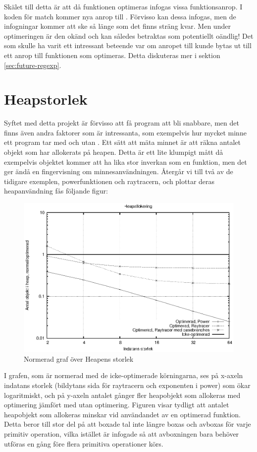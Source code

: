 \documentclass[Rapport]{subfiles}
\begin{document}
Skälet till detta är att då funktionen  optimeras infogas
vissa funktionsanrop. I koden för match kommer nya anrop till .
Förvisso kan dessa infogas, men de infogningar kommer att ske så länge som det
finns sträng kvar. Men under optimeringen är den okänd och kan således betraktas
som potentiellt oändlig! Det som skulle ha varit ett intressant beteende var
om anropet till  kunde bytas ut till ett anrop till funktionen
som optimeras. Detta diskuteras mer i sektion
\ref{sec:future-regexp}.



\section{Heapstorlek}
Syftet med detta projekt är förvisso att få program att bli snabbare, men det finns även andra faktorer som är intressanta, som exempelvis hur mycket minne ett program tar med och utan . Ett sätt att mäta minnet är att räkna antalet objekt som har allokerats på heapen. Detta är ett lite klumpigt mått då exempelvis objektet  kommer att ha lika stor inverkan som en funktion, men det ger ändå en fingervisning om minnesanvändningen.
Återgår vi till två av de tidigare exemplen, powerfunktionen och raytracern, och plottar deras heapanvändning fås följande figur:

\begin{figure}[H]
\includegraphics{heap.eps}
\caption{Normerad graf över Heapens storlek}
\label{fig:Resultat:heap:graf}
\end{figure}

I grafen, som är normerad med de icke-optimerade körningarna, ses
på x-axeln indatans storlek (bildytans sida för raytracern och exponenten i power) som ökar logaritmiskt, och 
på y-axeln antalet gånger fler heapobjekt som allokeras med optimering jämfört med utan optimering.
Figuren visar tydligt att antalet heapobjekt som allokeras minskar vid användandet av en optimerad funktion. Detta beror till stor del på att boxade tal inte längre boxas och avboxas för varje primitiv operation, vilka istället är infogade så att avboxningen bara behöver utföras en gång före flera primitiva operationer körs.
\end{document}
